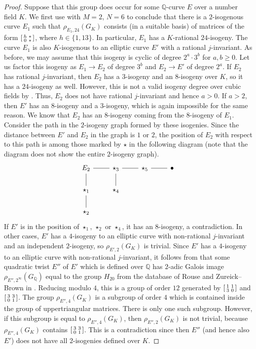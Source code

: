 \documentclass[10pt,leqno]{amsart}
\newcommand\sm[1]{\begin{bsmallmatrix}#1\end{bsmallmatrix}}
\newcommand{\Q}{\mathbb{Q}}
\theoremstyle{definition}
\theoremstyle{remark}
\numberwithin{theorem}{section}
\begin{document}
\begin{proof}
    Suppose that this group does occur for some $\Q$-curve $E$ over a number field $K$. We first use  with $M=2$, $N=6$ to conclude that there is a $2$-isogenous curve $E_1$ such that $\rho_{E_1, 24}(G_K)$ consists (in a suitable basis) of matrices of the form $\sm{h & * \\
    0  & * }$, where $h \in\{1,13\}$. In particular, $E_1$ has a $K$-rational $24$-isogeny. The curve $E_1$ is also $K$-isogenous to an elliptic curve $E'$ with a rational $j$-invariant.  As before, we may assume that this isogeny is cyclic of degree $2^a \cdot 3^b$ for $a,b\geq 0$. Let us factor this isogeny as $E_1 \to E_2$ of degree $3^b$ and $E_2 \to E'$ of degree $2^a$. If $E_2$ has rational $j$-invariant, then $E_2$ has a $3$-isogeny and an $8$-isogeny over $K$, so it has a $24$-isogeny as well. However, this is not a valid isogeny degree over cubic fields by \cite[Theorem 1.2]{ja}. Thus, $E_2$ does not have rational $j$-invariant and hence $a>0$. If $a>2$, then $E'$ has an $8$-isogeny and a $3$-isogeny, which is again impossible for the same reason. We know that $E_2$ has an $8$-isogeny coming from the $8$-isogeny of $E_1$. Consider the path in the $2$-isogeny graph formed by these isogenies. Since the distance between $E'$ and $E_2$ in the graph is $1$ or $2$, the position of $E_2$ with respect to this path is among those marked by $\star$ in the following diagram (note that the diagram does not show the entire $2$-isogeny graph). 
    \[\begin{tikzcd}
	{E_2} & {\star_3} & {\star_5} & \bullet \\
	{\star_1} & {\star_4} \\
	{\star_2}
	\arrow[no head, from=1-1, to=1-2]
	\arrow[no head, from=1-1, to=2-1]
	\arrow[no head, from=1-2, to=1-3]
	\arrow[no head, from=1-3, to=1-4]
	\arrow[no head, from=2-1, to=3-1]
	\arrow[no head, from=2-2, to=1-2]
\end{tikzcd}\]
    If $E'$ is in the position of $\star_1$,  $\star_2$ or $\star_4$, it has an $8$-isogeny, a contradiction. In other cases, $E'$ has a $4$-isogeny to an elliptic curve with non-rational $j$-invariant and an independent $2$-isogeny, so $\rho_{E', 2}(G_K)$ is trivial. Since $E'$ has a $4$-isogeny to an elliptic curve with non-rational $j$-invariant, it follows from \cite[Proposition 3.2]{ja} that some quadratic twist $E''$ of $E'$ which is defined over $\Q$ has $2$-adic Galois image $\rho_{E'', 2^\infty}(G_\Q)$ equal to the group $H_{20}$ from the database of Rouse and Zureick--Brown in \cite{rouse-zureickbrown-2adic}. Reducing modulo $4$, this is a group of order $12$ generated by $\sm{1 & 1 \\ 3 & 0}$ and $\sm{3 & 3 \\ 0 & 1}$. The group $\rho_{E'',4}(G_K)$ is a subgroup of order $4$ which is contained inside the group of uppertriangular matrices. There is only one such subgroup. However, if this subgroup is equal to $\rho_{E'',4}(G_K)$, then $\rho_{E'',2}(G_K)$ is not trivial, because $\rho_{E'', 4}(G_K)$ contains $\sm{3 & 3 \\ 0 & 1}$.  This is a contradiction since then $E''$ (and hence also $E'$) does not have all $2$-isogenies defined over $K$.

\end{proof}
\end{document}
